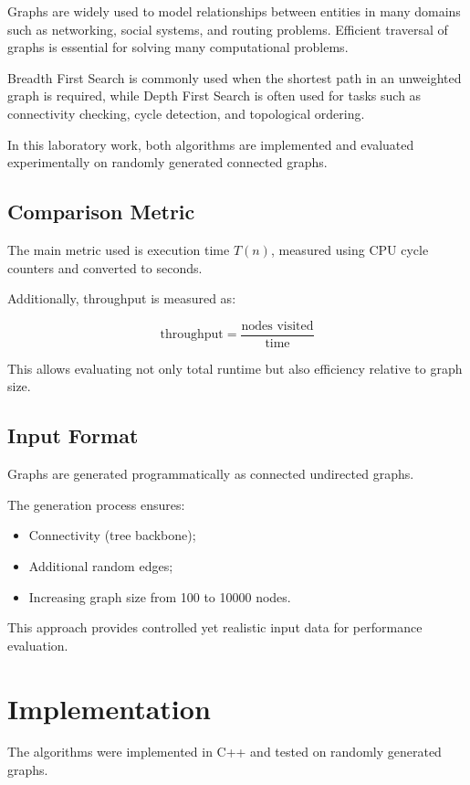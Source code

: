 \documentclass[12pt]{article}
\begin{document}
Graphs are widely used to model relationships between entities in many domains such as networking, social systems, and routing problems. Efficient traversal of graphs is essential for solving many computational problems.

Breadth First Search is commonly used when the shortest path in an unweighted graph is required, while Depth First Search is often used for tasks such as connectivity checking, cycle detection, and topological ordering.

In this laboratory work, both algorithms are implemented and evaluated experimentally on randomly generated connected graphs.

\subsection{Comparison Metric}

The main metric used is execution time \(T(n)\), measured using CPU cycle counters and converted to seconds.

Additionally, throughput is measured as:

\[
\text{throughput} = \frac{\text{nodes visited}}{\text{time}}
\]

This allows evaluating not only total runtime but also efficiency relative to graph size.

\subsection{Input Format}

Graphs are generated programmatically as connected undirected graphs.

The generation process ensures:

\begin{itemize}
    \item Connectivity (tree backbone);
    \item Additional random edges;
    \item Increasing graph size from 100 to 10000 nodes.
\end{itemize}

This approach provides controlled yet realistic input data for performance evaluation.

\section{Implementation}

The algorithms were implemented in C++ and tested on randomly generated graphs.
\end{document}
